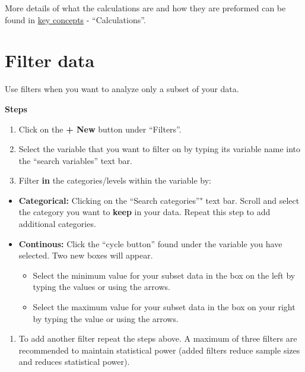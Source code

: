 \documentclass[]{book}
\providecommand{\tightlist}{%
  \setlength{\itemsep}{0pt}\setlength{\parskip}{0pt}}
\begin{document}
More details of what the calculations are and how they are preformed can be found in \protect\hyperlink{keyconcepts}{key concepts} - ``Calculations''.

\hypertarget{filter-data}{%
\section{Filter data}\label{filter-data}}

Use filters when you want to analyze only a subset of your data.

\textbf{Steps}

\begin{enumerate}
\def\labelenumi{\arabic{enumi}.}
\item
  Click on the \textbf{+ New} button under ``Filters''.
\item
  Select the variable that you want to filter on by typing its variable name into the ``search variables'' text bar.
\item
  Filter \textbf{in} the categories/levels within the variable by:
\end{enumerate}

\begin{itemize}
\item
  \textbf{Categorical:} Clicking on the ``Search categories''" text bar. Scroll and select the category you want to \textbf{keep} in your data. Repeat this step to add additional categories.
\item
  \textbf{Continous:} Click the ``cycle button'' found under the variable you have selected. Two new boxes will appear.

  \begin{itemize}
  \tightlist
  \item
    Select the minimum value for your subset data in the box on the left by typing the values or using the arrows.
  \item
    Select the maximum value for your subset data in the box on your right by typing the value or using the arrows.
  \end{itemize}
\end{itemize}

\begin{enumerate}
\def\labelenumi{\arabic{enumi}.}
\setcounter{enumi}{3}
\tightlist
\item
  To add another filter repeat the steps above. A maximum of three filters are recommended to maintain statistical power (added filters reduce sample sizes and reduces statistical power).
\end{enumerate}
\end{document}
